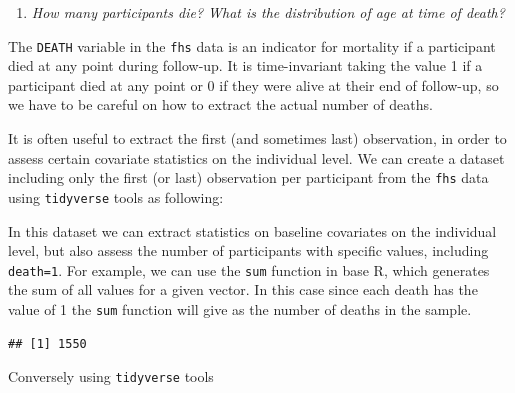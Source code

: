 \documentclass[
]{book}
\newenvironment{Shaded}{\begin{snugshade}}{\end{snugshade}}
\newcommand{\KeywordTok}[1]{\textcolor[rgb]{0.13,0.29,0.53}{\textbf{#1}}}
\newcommand{\NormalTok}[1]{#1}
\newcommand{\OperatorTok}[1]{\textcolor[rgb]{0.81,0.36,0.00}{\textbf{#1}}}
\newcommand{\StringTok}[1]{\textcolor[rgb]{0.31,0.60,0.02}{#1}}
\providecommand{\tightlist}{%
  \setlength{\itemsep}{0pt}\setlength{\parskip}{0pt}}
\begin{document}
\begin{enumerate}
\def\labelenumi{\arabic{enumi}.}
\setcounter{enumi}{2}
\tightlist
\item
  \emph{How many participants die? What is the distribution of age at time of death?}
\end{enumerate}

The \texttt{DEATH} variable in the \texttt{fhs} data is an indicator for mortality if a participant died at any point during follow-up. It is time-invariant taking the value 1 if a participant died at any point or 0 if they were alive at their end of follow-up, so we have to be careful on how to extract the actual number of deaths.

It is often useful to extract the first (and sometimes last) observation, in order to assess certain covariate statistics on the individual level. We can create a dataset including only the first (or last) observation per participant from the \texttt{fhs} data using \texttt{tidyverse} tools as following:

\begin{Shaded}
\end{Shaded}

In this dataset we can extract statistics on baseline covariates on the individual level, but also assess the number of participants with specific values, including \texttt{death=1}. For example, we can use the \texttt{sum} function in base R, which generates the sum of all values for a given vector. In this case since each death has the value of 1 the \texttt{sum} function will give as the number of deaths in the sample.

\begin{Shaded}
\end{Shaded}

\begin{verbatim}
## [1] 1550
\end{verbatim}

Conversely using \texttt{tidyverse} tools
\end{document}
